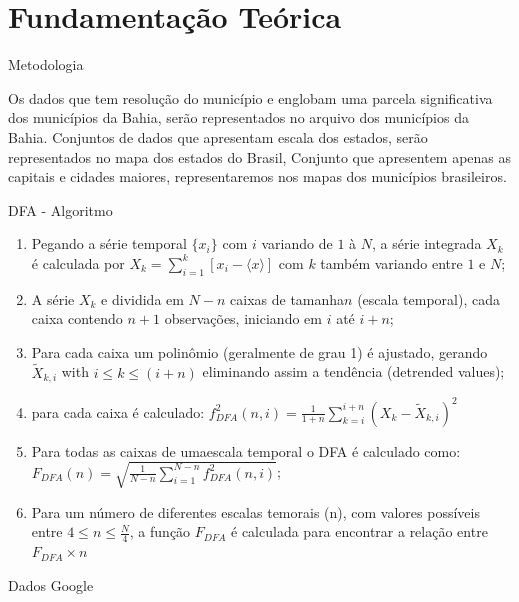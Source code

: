 \documentclass[10pt]{beamer}
\begin{document}
\section{Fundamentação Teórica}

\begin{frame}{Metodologia}

  Os dados que tem resolução do município e englobam uma parcela significativa dos municípios da Bahia, serão representados no arquivo dos municípios da Bahia. Conjuntos de dados que apresentam escala dos estados, serão representados no mapa dos estados do Brasil, Conjunto que apresentem apenas as capitais e cidades maiores, representaremos nos mapas dos municípios brasileiros.

\end{frame}

\begin{frame}{DFA - Algoritmo}

  \begin{enumerate}
    \label{dfa}
    \item Pegando a série temporal \(\{x_{i}\}\) com  \(i\) variando de  \(1\) à \(N\), a série integrada \(X_{k}\) é calculada por \(X_{k} = \sum_{i=1}^{k}\left[x_{i} - \langle x \rangle \right] \) com \(k\) também variando entre \(1\) e \(N\);
    \item A série  \(X_{k}\) e dividida em \(N - n\) caixas de tamanha\(n\) (escala temporal), cada caixa contendo \(n + 1\) observações, iniciando em \(i\) até \(i + n\);
    \item Para cada caixa um polinômio (geralmente de grau 1) é ajustado, gerando \(\widetilde{X}_{k, i}\) with \( i \le k \le (i + n) \) eliminando assim a tendência (detrended values);
    \item  para cada caixa é calculado: \(f_{DFA}^{2}(n, i) = \frac{1}{1+n} \sum_{k=i}^{i + n}(X_{k}-\widetilde{X}_{k, i})^{2}\)
    \item Para todas as caixas de umaescala temporal o DFA é calculado como: \(F_{DFA}(n) = \sqrt{\frac{1}{N - n} \sum_{i=1}^{N-n} f_{DFA}^{2}(n, i)}\);
    \item Para um número de diferentes escalas temorais (n), com valores possíveis entre \( 4 \le n \le \frac{N}{4}\), a função \(F_{DFA}\) é calculada para encontrar a relação entre \(F_{DFA} \times n\)
  \end{enumerate}
 

\end{frame}

\begin{frame}{Dados Google}




 


\end{frame}
\end{document}
